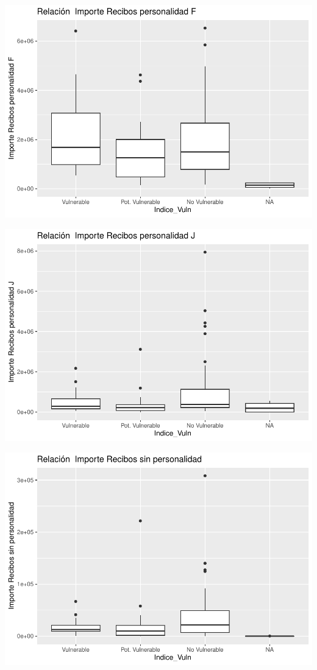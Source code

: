 \documentclass[notspecified,article,submit,moreauthors,pdftex]{Definitions/mdpi}
\begin{document}
\begin{center}\includegraphics{./figure/unnamed-chunk-23-17} \end{center}

\begin{center}\includegraphics{./figure/unnamed-chunk-23-18} \end{center}

\begin{center}\includegraphics{./figure/unnamed-chunk-23-19} \end{center}
\end{document}
